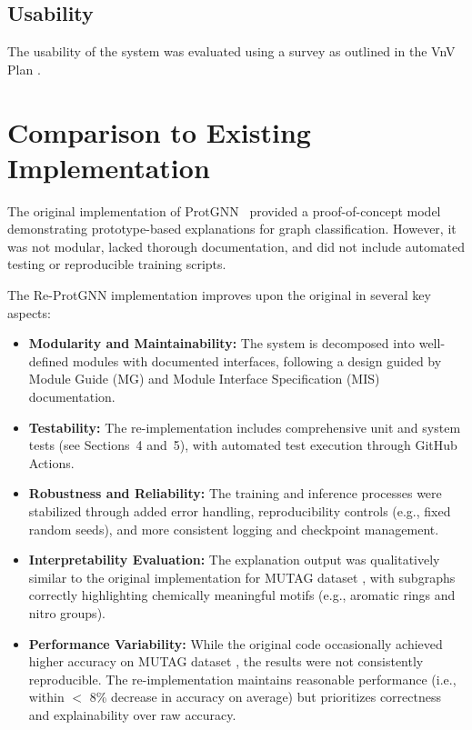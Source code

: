 \documentclass[12pt, titlepage]{article}
\begin{document}
\subsection{Usability}
The usability of the system was evaluated using a survey as outlined in the
VnV Plan \citep{Yuanqi_ReProtGNN_VnV}.

\section{Comparison to Existing Implementation}	

The original implementation of ProtGNN~\citep{Zhang:2022:ProtGNN} provided a proof-of-concept model demonstrating prototype-based explanations for graph classification. However, it was not modular, lacked thorough documentation, and did not include automated testing or reproducible training scripts.

The Re-ProtGNN implementation improves upon the original in several key aspects:

\begin{itemize}
    \item \textbf{Modularity and Maintainability:} The system is decomposed into well-defined modules with documented interfaces, following a design guided by Module Guide (MG) and Module Interface Specification (MIS) documentation.
    
    \item \textbf{Testability:} The re-implementation includes comprehensive unit and system tests (see Sections~4 and~5), with automated test execution through GitHub Actions.
    
    \item \textbf{Robustness and Reliability:} The training and inference processes were stabilized through added error handling, reproducibility controls (e.g., fixed random seeds), and more consistent logging and checkpoint management.
    
    \item \textbf{Interpretability Evaluation:} The explanation output was qualitatively similar to the original implementation for MUTAG dataset \citep{debnath1991structure}, with subgraphs correctly highlighting chemically meaningful motifs (e.g., aromatic rings and nitro groups).
    
    \item \textbf{Performance Variability:} While the original code occasionally achieved higher accuracy on MUTAG dataset \citep{debnath1991structure}, the results were not consistently reproducible. The re-implementation maintains reasonable performance (i.e., within $<$ 8\% decrease in accuracy on average) but prioritizes correctness and explainability over raw accuracy.
\end{itemize}
\end{document}
